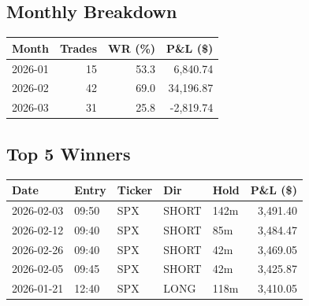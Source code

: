 \documentclass[11pt,a4paper,twoside]{article}
\begin{document}
\subsection*{Monthly Breakdown}
\noindent\begin{center}
\begin{tabular}{>{\color{txtmain}}l rrr}
\toprule
\rowcolor{cardbg}
\textbf{Month} & \textbf{Trades} & \textbf{WR (\%)} & \textbf{P\&L (\$)} \\
\midrule
2026-01 & 15 & 53.3 & \textcolor{wingreen}{6,840.74} \\
2026-02 & 42 & 69.0 & \textcolor{wingreen}{34,196.87} \\
2026-03 & 31 & 25.8 & \textcolor{lossred}{-2,819.74} \\
\bottomrule
\end{tabular}
\end{center}
\subsection*{Top 5 Winners}
\noindent\begin{center}
\begin{tabular}{>{\color{txtmain}}l llll r}
\toprule
\rowcolor{cardbg}
\textbf{Date} & \textbf{Entry} & \textbf{Ticker} & \textbf{Dir} & \textbf{Hold} & \textbf{P\&L (\$)} \\
\midrule
2026-02-03 & 09:50 & SPX & SHORT & 142m & \textcolor{wingreen}{3,491.40} \\
2026-02-12 & 09:40 & SPX & SHORT & 85m & \textcolor{wingreen}{3,484.47} \\
2026-02-26 & 09:40 & SPX & SHORT & 42m & \textcolor{wingreen}{3,469.05} \\
2026-02-05 & 09:45 & SPX & SHORT & 42m & \textcolor{wingreen}{3,425.87} \\
2026-01-21 & 12:40 & SPX & LONG & 118m & \textcolor{wingreen}{3,410.05} \\
\bottomrule
\end{tabular}
\end{center}
\end{document}
